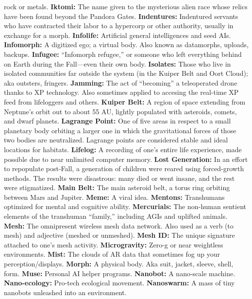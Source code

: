 rock or metals.
\textbf{ Iktomi:} The name given to the mysterious alien race 
whose relics have been found beyond the Pandora Gates.
\textbf{ Indentures:} Indentured servants who have contracted 
their labor to a hypercorp or other authority, usually in 
exchange for a morph.
\textbf{ Infolife:} Artificial general intelligences and seed AIs.
\textbf{ Infomorph:} A digitized ego; a virtual body. Also known 
as datamorphs, uploads, backups.
\textbf{ Infugee:} ``Infomorph refugee,'' or someone who left 
everything behind on Earth during the Fall—even their 
own body.
\textbf{ Isolates:} Those who live in isolated communities far 
outside the system (in the Kuiper Belt and Oort Cloud); 
aka outsters, fringers.
\textbf{ Jamming:} The act of ``becoming'' a teleoperated drone 
thanks to XP technology. Also sometimes applied to 
accesing the real-time XP feed from lifeloggers and others.
\textbf{ Kuiper Belt:} A region of space extending from Neptune's 
orbit out to about 55 AU, lightly populated with asteroids, 
comets, and dwarf planets.
\textbf{ Lagrange Point:} One of five areas in respect to a 
small planetary body orbiting a larger one in which the 
gravitational forces of those two bodies are neutralized. 
Lagrange points are considered stable and ideal locations 
for habitats.
\textbf{ Lifelog:} A recording of one's entire life experience, made 
possible due to near unlimited computer memory.
\textbf{ Lost Generation:} In an effort to repopulate post-Fall, a 
generation of children were reared using forced-growth 
methods. The results were disastrous: many died or went 
insane, and the rest were stigmatized.
\textbf{ Main Belt:} The main asteroid belt, a torus ring orbiting 
between Mars and Jupiter.
\textbf{ Meme:} A viral idea.
\textbf{ Mentons:} Transhumans optimized for mental and 
cognitive ability.
\textbf{ Mercurials:} The non-human sentient elements of the 
transhuman ``family,'' including AGIs and uplifted animals.
\textbf{ Mesh:} The omnipresent wireless mesh data network. 
Also used as a verb (to mesh) and adjective (meshed or 
unmeshed).
\textbf{ Mesh ID:} The unique signature attached to one's mesh 
activity.
\textbf{ Microgravity:} Zero-g or near weightless environments.
\textbf{ Mist:} The clouds of AR data that sometimes fog up your 
perception/displays.
\textbf{ Morph:} A physical body. Aka suit, jacket, sleeve, shell, form.
\textbf{ Muse:} Personal AI helper programs.
\textbf{ Nanobot:} A nano-scale machine.
\textbf{ Nano-ecology:} Pro-tech ecological movement.
\textbf{ Nanoswarm:} A mass of tiny nanobots unleashed into an 
environment.
